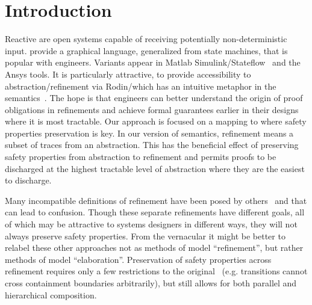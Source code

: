

\section{Introduction}
\label{sec:intro}

Reactive \SCs are open systems capable of receiving potentially non-deterministic input. 
\SCs provide a graphical language, generalized from state machines, that is popular with engineers.
Variants appear in Matlab Simulink/Stateflow~\cite{MATLAB:2019} and the Ansys tools.  
It is particularly attractive, to provide accessibility to abstraction/refinement via Rodin/\EventB which has an intuitive metaphor in the \SC semantics~\cite{MoSnHo18,MoSnHo-ABZ2020,detect2020}.  
The hope is that engineers can better understand the origin of proof obligations in refinements and achieve formal guarantees earlier in their designs where it is most tractable.
Our approach is focused on a mapping to \EventB where safety properties preservation is key.  
In our version of \SC semantics, refinement means a subset of traces from an abstraction. 
This has the beneficial effect of preserving safety properties from abstraction to refinement and permits proofs to be discharged at the highest tractable level of abstraction where they are the easiest to discharge.

Many incompatible definitions of refinement have been posed by others~\cite{Syriani_2019,Maraninchi91theargos} and that can lead to confusion.  
Though these separate refinements have different goals, all of which may be attractive to systems designers in different ways,
they will not always preserve safety properties.  
From the \EventB vernacular it might be better to relabel these other approaches not as methods of model ``refinement'', but rather methods of model ``elaboration''.  
Preservation of safety properties across refinement requires only a few restrictions to the original~\cite{Harel} \SCs (e.g. transitions cannot cross containment boundaries arbitrarily), but still allows for both parallel and hierarchical composition. 


